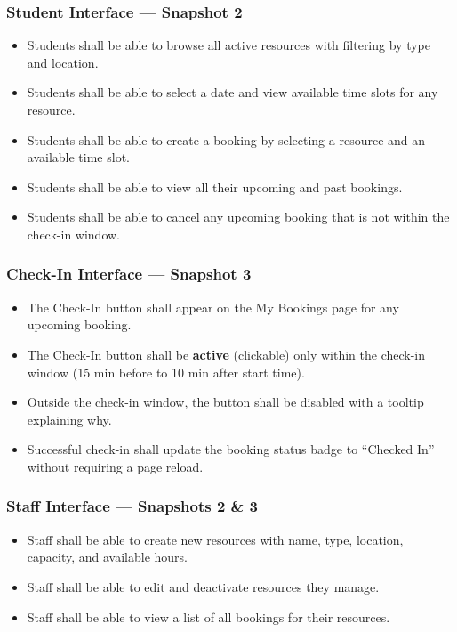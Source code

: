 \documentclass[12pt]{article}
\begin{document}
\subsubsection{Student Interface --- Snapshot 2}
\begin{itemize}
    \item Students shall be able to browse all active resources with filtering by type and location.
    \item Students shall be able to select a date and view available time slots for any resource.
    \item Students shall be able to create a booking by selecting a resource and an available time slot.
    \item Students shall be able to view all their upcoming and past bookings.
    \item Students shall be able to cancel any upcoming booking that is not within the check-in window.
\end{itemize}

\subsubsection{Check-In Interface --- Snapshot 3}
\begin{itemize}
    \item The Check-In button shall appear on the My Bookings page for any upcoming booking.
    \item The Check-In button shall be \textbf{active} (clickable) only within the check-in window (15 min before to 10 min after start time).
    \item Outside the check-in window, the button shall be disabled with a tooltip explaining why.
    \item Successful check-in shall update the booking status badge to ``Checked In'' without requiring a page reload.
\end{itemize}

\subsubsection{Staff Interface --- Snapshots 2 \& 3}
\begin{itemize}
    \item Staff shall be able to create new resources with name, type, location, capacity, and available hours.
    \item Staff shall be able to edit and deactivate resources they manage.
    \item Staff shall be able to view a list of all bookings for their resources.
\end{itemize}
\end{document}
